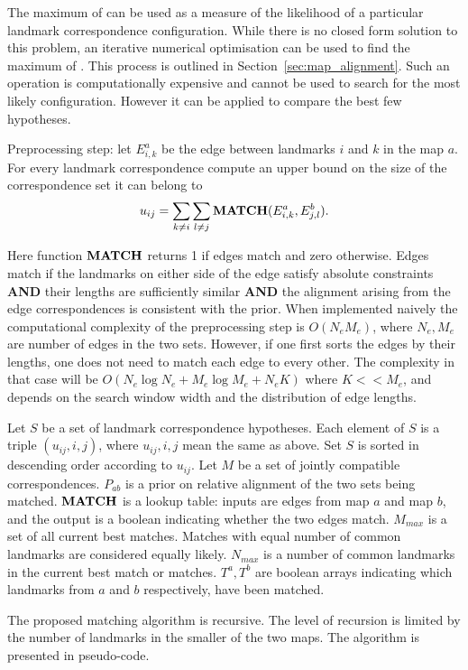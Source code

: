 The maximum of  can be used as a measure of
the likelihood of a particular landmark correspondence configuration.
While there is no closed form solution to this problem, an iterative
numerical optimisation can be used to find the maximum of
. This process is outlined in
Section~\ref{sec:map_alignment}. Such an operation is computationally
expensive and cannot be used to search for the most likely
configuration. However it can be applied to compare the best few
hypotheses.



Preprocessing step: let $E^a_{i,k}$ be the edge between landmarks $i$
and $k$ in the map $a$. For every landmark correspondence compute an
upper bound on the size of the correspondence set it can belong to
$$
u_{ij} = \sum_{k \ne i} \sum_{l \ne j} {\bf MATCH}(E^a_{i,k}, E^b_{j,l}).
$$

Here function ${\bf MATCH}$ returns 1 if edges match and zero
otherwise. Edges match if the landmarks on either side of the edge
satisfy absolute constraints {\bf AND} their lengths are sufficiently
similar {\bf AND} the alignment arising from the edge correspondences
is consistent with the prior. When implemented naively the
computational complexity of the preprocessing step is $O(N_eM_e)$,
where $N_e,M_e$ are number of edges in the two sets. However, if one
first sorts the edges by their lengths, one does not need to match
each edge to every other. The complexity in that case will be
$O(N_e\log N_e + M_e\log M_e + N_eK)$ where $K << M_e$, and depends on
the search window width and the distribution of edge lengths.

Let $S$ be a set of landmark correspondence hypotheses. Each element
of $S$ is a triple $(u_{ij}, i, j)$, where $u_{ij},i,j$ mean the same
as above. Set $S$ is sorted in descending order according to
$u_{ij}$. Let $M$ be a set of jointly compatible
correspondences. $P_{ab}$ is a prior on relative alignment of the two
sets being matched. ${\bf MATCH}$ is a lookup table: inputs are edges
from map $a$ and map $b$, and the output is a boolean indicating
whether the two edges match. $M_{max}$ is a set of all current best
matches. Matches with equal number of common landmarks are considered
equally likely. $N_{max}$ is a number of common landmarks in the
current best match or matches. $T^a,T^b$ are boolean arrays indicating
which landmarks from $a$ and $b$ respectively, have been matched.

The proposed matching algorithm is recursive. The level of recursion
is limited by the number of landmarks in the smaller of the two
maps. The algorithm is presented in pseudo-code.


